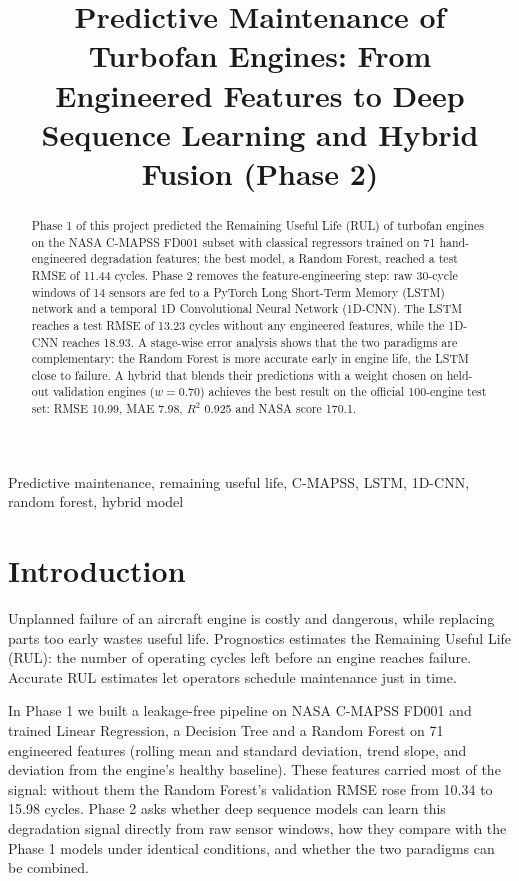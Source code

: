 \documentclass[conference]{IEEEtran}
\begin{document}
\title{Predictive Maintenance of Turbofan Engines: From Engineered Features to Deep Sequence Learning and Hybrid Fusion (Phase 2)}
\author{
}

\maketitle
\begin{abstract}
Phase 1 of this project predicted the Remaining Useful Life (RUL) of turbofan engines on the NASA C-MAPSS FD001 subset with classical regressors trained on 71 hand-engineered degradation features; the best model, a Random Forest, reached a test RMSE of 11.44 cycles. Phase 2 removes the feature-engineering step: raw 30-cycle windows of 14 sensors are fed to a PyTorch Long Short-Term Memory (LSTM) network and a temporal 1D Convolutional Neural Network (1D-CNN). The LSTM reaches a test RMSE of 13.23 cycles without any engineered features, while the 1D-CNN reaches 18.93. A stage-wise error analysis shows that the two paradigms are complementary: the Random Forest is more accurate early in engine life, the LSTM close to failure. A hybrid that blends their predictions with a weight chosen on held-out validation engines ($w = 0.70$) achieves the best result on the official 100-engine test set: RMSE 10.99, MAE 7.98, $R^2$ 0.925 and NASA score 170.1.
\end{abstract}

\begin{IEEEkeywords}
Predictive maintenance, remaining useful life, C-MAPSS, LSTM, 1D-CNN, random forest, hybrid model
\end{IEEEkeywords}

\section{Introduction}
Unplanned failure of an aircraft engine is costly and dangerous, while replacing parts too early wastes useful life. Prognostics estimates the Remaining Useful Life (RUL): the number of operating cycles left before an engine reaches failure. Accurate RUL estimates let operators schedule maintenance just in time.

In Phase 1 we built a leakage-free pipeline on NASA C-MAPSS FD001 and trained Linear Regression, a Decision Tree and a Random Forest on 71 engineered features (rolling mean and standard deviation, trend slope, and deviation from the engine's healthy baseline). These features carried most of the signal: without them the Random Forest's validation RMSE rose from 10.34 to 15.98 cycles. Phase 2 asks whether deep sequence models can learn this degradation signal directly from raw sensor windows, how they compare with the Phase 1 models under identical conditions, and whether the two paradigms can be combined.
\end{document}
